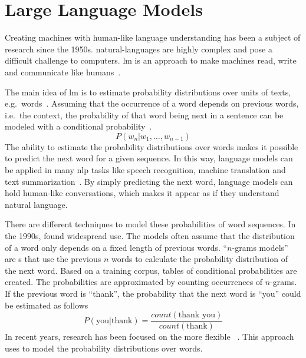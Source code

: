 \chapter{Large Language Models}\label{ch:techOverview}

Creating machines with human-like language understanding has been a subject of research since the 1950s.
\gls{natural-language}s are highly complex and pose a difficult challenge to computers.
\gls{lm} is an approach to make machines read, write and communicate like humans~\autocite{zhao2023survey}.

The main idea of \gls{lm} is to estimate probability distributions over units of texts, e.g.\ words~\autocite{de2015survey}.
Assuming that the occurrence of a word depends on previous words, i.e.\ the context, the probability of that word being next in a sentence can be modeled with a conditional probability~\autocite{jozefowicz2016exploring}.
\[
    P(w_n | w_1, \dots , w_{n-1})
\]
The ability to estimate the probability distributions over words makes it possible to predict the next word for a given sequence.
In this way, language models can be applied in many \gls{nlp} tasks like speech recognition, machine translation and text summarization~\autocite{jozefowicz2016exploring}.
By simply predicting the next word, language models can hold human-like conversations, which makes it appear as if they understand natural language.

There are different techniques to model these probabilities of word sequences.
In the 1990s,  found widespread use.
The models often assume that the distribution of a word only depends on a fixed length of previous words.
\enquote{$n$-grams models} are s that use the previous $n$ words to calculate the probability distribution of the next word.
Based on a training corpus, tables of conditional probabilities are created.
The probabilities are approximated by counting occurrences of $n$-grams.
If the previous word is \enquote{thank}, the probability that the next word is \enquote{you} could be estimated as follows~\autocite{quadarLM2020}
\[
    P(\text{you} | \text{thank}) = \frac{count(\text{thank you})}{count(\text{thank})}
\]
In recent years, research has been focused on the more flexible ~\autocite{quadarLM2020}.
This approach uses  to model the probability distributions over words.


